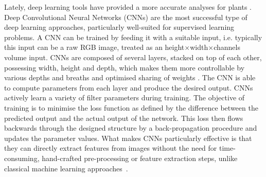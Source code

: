 \documentclass[a4paper,num-refs]{oup-contemporary}
\begin{document}
 Lately, deep learning tools have provided a more accurate analyses for plants \cite{pound2016deep, mohanty2016using, ubbens2018use, namin2017deep, ubbens2017deep, pawara2017comparing, fuentes2017robust, wang2017automatic, ramcharan2017transfer}. 
Deep Convolutional Neural Networks (CNNs) are the most successful type of deep learning approaches, particularly well-suited for supervised learning problems. A CNN can be trained by feeding it with a suitable input, i.e. typically this input can be a raw RGB image, treated as an height$\times$width$\times$channels volume input.  CNNs are composed of several layers, stacked on top of each other, possessing width, height and depth, which makes them more controllable by various depths and breaths and optimised sharing of weights \cite{simonyan2014very}. The CNN is able to compute parameters from each layer and  produce the desired output. CNNs actively learn a variety of filter parameters during training. The objective of training is to minimise the loss function as defined by the difference between the predicted output and the actual output of the network. This loss then flows backwards through the designed structure by a back-propagation procedure and updates the parameter values. What makes CNNs   particularly effective is that they can directly extract features from images without the need for time-consuming, hand-crafted pre-processing or feature extraction steps, unlike classical machine learning approaches~\cite{krizhevsky2009learning}.
\end{document}
